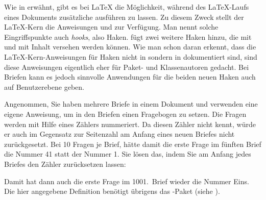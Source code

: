\else%
  Wie in \cite{latex:clsguide} erwähnt, gibt es bei
  \LaTeX{} die Möglichkeit, während des \LaTeX-Laufs eines Dokuments
  zusätzliche  ausführen zu lassen. Zu diesem Zweck stellt
  der \LaTeX-Kern die Anweisungen 
  und  zur Verfügung. Man
  nennt solche Eingriffspunkte auch \emph{hooks}, also
  Haken. \KOMAScript{} fügt zwei weitere Haken hinzu, die mit
   und
   mit Inhalt versehen
  werden können. Wie man schon daran erkennt, dass die \LaTeX-Kern-Anweisungen
  für Haken nicht in \cite{latex:usrguide-historic} sondern in
  \cite{latex:clsguide} dokumentiert sind, sind diese Anweisungen eigentlich
  eher für Paket- und Klassenautoren gedacht. Bei Briefen kann es jedoch
  sinnvolle Anwendungen für die beiden neuen Haken auch auf Benutzerebene
  geben.%
  \begin{Example}
    Angenommen, Sie haben mehrere Briefe in einem Dokument und verwenden
    eine eigene Anweisung, um in den Briefen einen Fragebogen
    zu setzen. Die Fragen werden mit Hilfe eines
    Zählers nummeriert. Da \KOMAScript{} diesen Zähler nicht kennt,
    würde er auch im Gegensatz zur Seitenzahl am Anfang eines
    neuen Briefes nicht zurückgesetzt. Bei 10 Fragen je Brief, hätte damit die
    erste Frage im fünften Brief die Nummer 41 statt der Nummer 1. Sie lösen
    das, indem Sie am Anfang jedes Briefes den Zähler zurücksetzen lassen:
\begin{lstcode}
  \newcommand{\Frage}[1]{%
    \refstepcounter{Frage}\par
    \noindent\begin{tabularx}{\textwidth}{l@{}X}
      \theFrage:~ & #1\\
    \end{tabularx}%
  }%
  \AtBeginLetter{\setcounter{Frage}{0}}
\end{lstcode}
    Damit hat dann auch die erste Frage im 1001.~Brief wieder die Nummer
    Eins. Die hier angegebene Definition benötigt übrigens das
    -Paket (siehe
    \cite{package:tabularx}).
  \end{Example}%
\fi
%
\EndIndexGroup
\ExampleEndFix%


